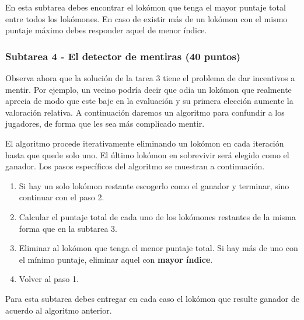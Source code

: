 \documentclass{oci}
\begin{document}

En esta subtarea debes encontrar el lokómon que tenga el mayor puntaje total
entre todos los lokómones.
En caso de existir más de un lokómon con el mismo puntaje máximo debes
responder aquel de menor índice.

\begin{sampleDescription}
\end{sampleDescription}

\subsubsection*{Subtarea 4 - El detector de mentiras (40 puntos)}
Observa ahora que la solución de la tarea 3 tiene el problema de dar incentivos
a mentir.
Por ejemplo, un vecino podría decir que odia un lokómon que realmente aprecia de
modo que este baje en la evaluación y su primera elección aumente la
valoración relativa. 
A continuación daremos un algoritmo para confundir a los jugadores, de forma que
les sea más complicado mentir.

El algoritmo procede iterativamente eliminando un lokómon en cada iteración
hasta que quede solo uno.
El último lokómon en sobrevivir será elegido como el ganador.
Los pasos específicos del algoritmo se muestran a continuación.

\begin{enumerate}
	\item Si hay un solo lokómon restante escogerlo como el ganador y terminar,
    sino continuar con el paso 2.
	\item Calcular el puntaje total de cada uno de los lokómones restantes de
    la misma forma que en la subtarea 3.
	\item Eliminar al lokómon que tenga el menor puntaje total.
    Si hay más de uno con el mínimo puntaje, eliminar aquel con \textbf{mayor
      índice}.
	\item Volver al paso 1.
\end{enumerate}

Para esta subtarea debes entregar en cada caso el lokómon que resulte ganador de
acuerdo al algoritmo anterior.

\begin{sampleDescription}
\end{sampleDescription}
\end{document}
